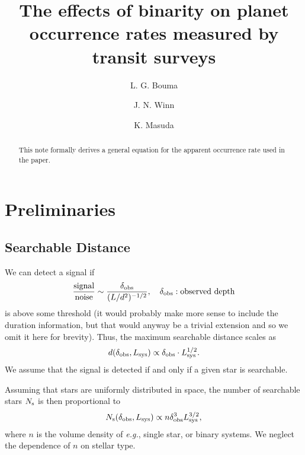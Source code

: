 \documentclass[12pt,modern]{aastex61}
\begin{document}
    
\title{ The effects of binarity on planet occurrence rates measured by transit 
surveys}
%
%
\author{L. G. Bouma}
\author{J. N. Winn}
\author{K. Masuda}
%
%
\begin{abstract}
%
This note formally derives a general equation for the apparent occurrence rate 
used in the paper.

%
\end{abstract}
%
%
%

\newcommand{\pt}{\theta}
\newcommand{\pa}{\theta_{\rm a}}
\newcommand{\pn}{\theta_0}

\newcommand{\pp}{\mathcal{P}}
\newcommand{\ps}{\mathcal{S}}
\renewcommand{\a}{_{\rm a}}
\newcommand{\s}{_{\rm s}}

\section{Preliminaries}

\subsection{Searchable Distance}

We can detect a signal if 
\begin{equation}
	{\text{signal}\over\text{noise}}\sim
    {\delta_{\rm obs}\over(L/d^2)^{-1/2}},
	\quad \delta_{\rm obs}:\text{observed depth}
    \label{eq:snr_limited}
\end{equation}
is above some threshold (it would probably make more sense to include the 
duration information, but that would anyway be a trivial extension and so we 
omit it here for brevity). Thus, the maximum searchable distance scales as
\begin{equation}
	d(\delta_{\rm obs}, L_{\rm sys}) \propto \delta_{\rm obs} \cdot L_{\rm 
	sys}^{1/2}.
\end{equation}
We assume that the signal is detected if and only if a given star is searchable. 

Assuming that stars are uniformly distributed in space, the number of 
searchable stars $N\s$ is then proportional to
\begin{equation}
	N\s(\delta_{\rm obs}, L_{\rm sys}) \propto n \delta_{\rm obs}^3 L_{\rm 
	sys}^{3/2},
\end{equation}
where $n$ is the volume density of {\it e.g.}, single star, or binary systems.
We neglect the dependence of $n$ on stellar type.
\end{document}
